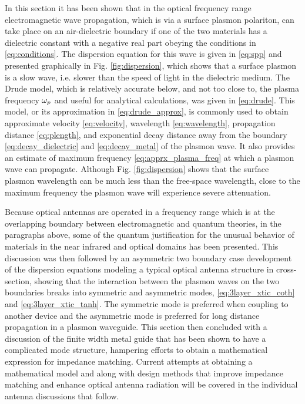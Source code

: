 \documentclass[11pt]{article}
\begin{document}
In this section it has been shown that in the optical frequency range electromagnetic wave propagation, which is via a surface plasmon polariton, can take place on an air-dielectric boundary if one of the two materials has a dielectric constant with a negative real part obeying the conditions in \eqref{eq:conditions}. The dispersion equation for this wave is given in \eqref{eq:spp} and presented graphically in Fig. \ref{fig:dispersion}, which shows that a surface plasmon is a slow wave, i.e. slower than the speed of light in the dielectric medium. The Drude model, which is relatively accurate below, and not too close to, the plasma frequency $\omega_p$ and useful for analytical calculations, was given in \eqref{eq:drude}. This model, or its approximation in \eqref{eq:drude_approx}, is commonly used to obtain approximate velocity \eqref{eq:velocity}, wavelength \eqref{eq:wavelength}, propagation distance \eqref{eq:plength}, and exponential decay distance away from the boundary \eqref{eq:decay_dielectric} and
\eqref{eq:decay_metal} of the plasmon wave. It also provides an estimate of maximum frequency \eqref{eq:apprx_plasma_freq} at which a plasmon wave can propagate. Although Fig. \ref{fig:dispersion} shows that the surface plasmon wavelength can be much less than the free-space wavelength, close to the maximum frequency the plasmon wave will experience severe attenuation.

Because optical antennas are operated in a frequency range which is at the overlapping boundary between electromagnetic and quantum theories, in the paragraphs above, some of the quantum justification for the unusual behavior of materials in the near infrared and optical domains has been presented. This discussion was then followed by an asymmetric two boundary case development of the dispersion equations modeling a typical optical antenna structure in cross-section, showing that the interaction between the plasmon waves on the two boundaries breaks into symmetric and asymmetric modes, \eqref{eq:3layer_xtic_coth} and \eqref{eq:3layer_xtic_tanh}. The symmetric mode is preferred when coupling to another device and the asymmetric mode is preferred for long distance propagation in a plasmon waveguide. This section then concluded with a discussion of the finite width metal guide that has been shown to have a complicated mode structure, hampering efforts to obtain a mathematical expression for impedance matching. Current attempts at obtaining a mathematical model and along with design methods that improve impedance matching and enhance optical antenna radiation will be covered in the individual antenna discussions that follow.
\end{document}
